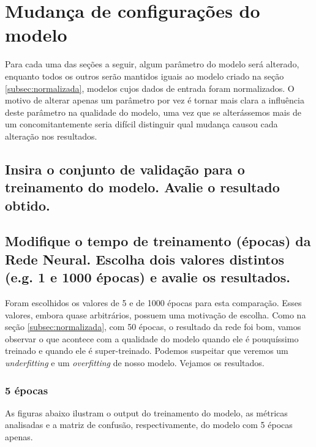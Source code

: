 \documentclass[12pt]{article}
\begin{document}
 
\section{Mudança de configurações do modelo}

Para cada uma das seções a seguir, algum parâmetro do modelo será alterado, enquanto todos os outros serão mantidos iguais ao modelo criado na seção \ref{subsec:normalizada}, modelos cujos dados de entrada foram normalizados. O motivo de alterar apenas um parâmetro por vez é tornar mais clara a influência deste parâmetro na qualidade do modelo, uma vez que se alterássemos mais de um concomitantemente seria difícil distinguir qual mudança causou cada alteração nos resultados.

\subsection{Insira o conjunto de validação para o treinamento do modelo. Avalie o resultado obtido.}

\subsection{Modifique o tempo de treinamento (épocas) da Rede Neural. Escolha dois valores distintos (e.g. 1 e 1000 épocas) e avalie os resultados.}

Foram escolhidos os valores de 5 e de 1000 épocas para esta comparação. Esses valores, embora quase arbitrários, possuem uma motivação de escolha. Como na seção \ref{subsec:normalizada}, com 50 épocas, o resultado da rede foi bom, vamos observar o que acontece com a qualidade do modelo quando ele é pouquíssimo treinado e quando ele é super-treinado. Podemos suspeitar que veremos um \textit{underfitting} e um \textit{overfitting} de nosso modelo. Vejamos os resultados.

\subsubsection{5 épocas}

As figuras abaixo ilustram o output do treinamento do modelo, as métricas analisadas e a matriz de confusão, respectivamente, do modelo com 5 épocas apenas.
\end{document}
